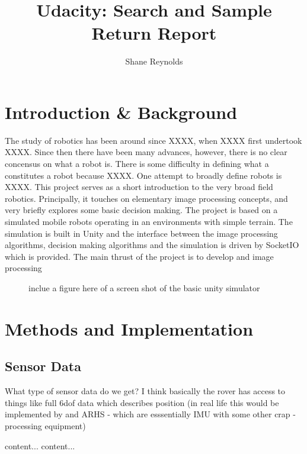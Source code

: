 \documentclass[a4paper]{article}
\begin{document}
\title{Udacity: Search and Sample Return Report}
\author{Shane Reynolds}
\maketitle
\section{Introduction \& Background}
The study of robotics has been around since XXXX, when XXXX first undertook XXXX. Since then there have been many advances, however, there is no clear concensus on what a robot is. There is some difficulty in defining what a constitutes a robot because XXXX. One attempt to broadly define robots is XXXX. This project serves as a short introduction to the very broad field robotics. Principally, it touches on elementary image processing concepts, and very briefly explores some basic decision making. The project is based on a simulated mobile robots operating in an environments with simple terrain. The simulation is built in Unity and the interface between the image processing algorithms, decision making algorithms and the simulation is driven by SocketIO which is provided. The main thrust of the project is to develop and image processing

\begin{figure}
\centering
\caption{inclue a figure here of a screen shot of the basic unity simulator}
\end{figure}

\section{Methods and Implementation}
\subsection{Sensor Data}
What type of sensor data do we get? I think basically the rover has access to things like full 6dof data which describes position (in real life this would be implemented by and ARHS - which are esssentially IMU with some other crap - processing equipment)

\begin{table}
\caption{A table which shows the different data types, their python format, and the frequency at which they are sampled from the simulated environment}
\begin{tabular}{content...}
content...
\end{tabular}
\end{table}
\end{document}
